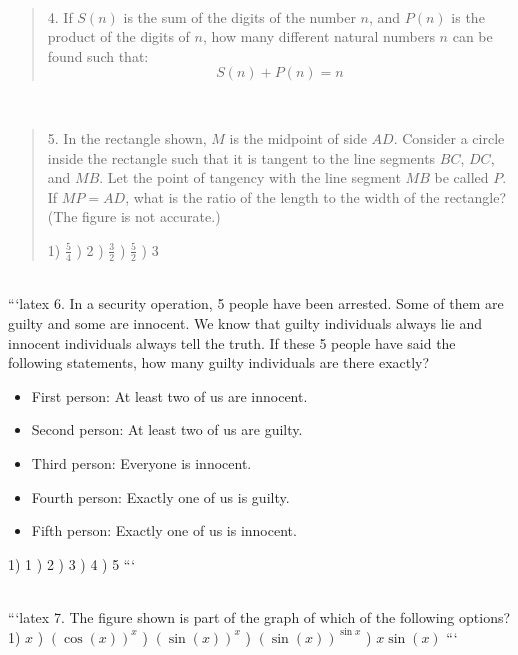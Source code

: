 \\
\begin{quote}
4. If $S(n)$ is the sum of the digits of the number $n$, and $P(n)$ is the product of the digits of $n$, how many different natural numbers $n$ can be found such that: 
\[ S(n) + P(n) = n \]
\end{quote}
\\
\begin{quote}
5. In the rectangle shown, \( M \) is the midpoint of side \( AD \). Consider a circle inside the rectangle such that it is tangent to the line segments \( BC \), \( DC \), and \( MB \). Let the point of tangency with the line segment \( MB \) be called \( P \). If \( MP = AD \), what is the ratio of the length to the width of the rectangle? (The figure is not accurate.)

1) \(\frac{5}{4}\) ) 2 ) \(\frac{3}{2}\) ) \(\frac{5}{2}\) ) 3
\end{quote}
\\
```latex
6. In a security operation, 5 people have been arrested. Some of them are guilty and some are innocent. We know that guilty individuals always lie and innocent individuals always tell the truth. If these 5 people have said the following statements, how many guilty individuals are there exactly?
\begin{itemize}
    \item First person: At least two of us are innocent.
    \item Second person: At least two of us are guilty.
    \item Third person: Everyone is innocent.
    \item Fourth person: Exactly one of us is guilty.
    \item Fifth person: Exactly one of us is innocent.
\end{itemize}
1) 1 ) 2 ) 3 ) 4 ) 5
```

\\
```latex
7. The figure shown is part of the graph of which of the following options?
1) $x$ ) $(\cos(x))^x$ ) $(\sin(x))^x$ ) $(\sin(x))^{\sin x}$ ) $x \sin(x)$
```


